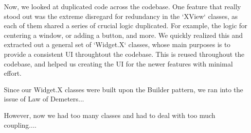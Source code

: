 Now, we looked at duplicated code across the codebase. One feature that really stood out was the extreme disregard for redundancy in the `XView` classes, as each of them shared a series of crucial logic duplicated. For example, the logic for centering a window, or adding a button, and more. We quickly realized this and extracted out a general set of `Widget.X` classes, whose main purposes is to provide a consistent UI throughtout the codebase. This is reused throughout the codebase, and helped us creating the UI for the newer features with minimal effort.

Since our Widget.X classes were built upon the Builder pattern, we ran into the issue of Law of Demeters...

However, now we had too many classes and had to deal with too much coupling....


